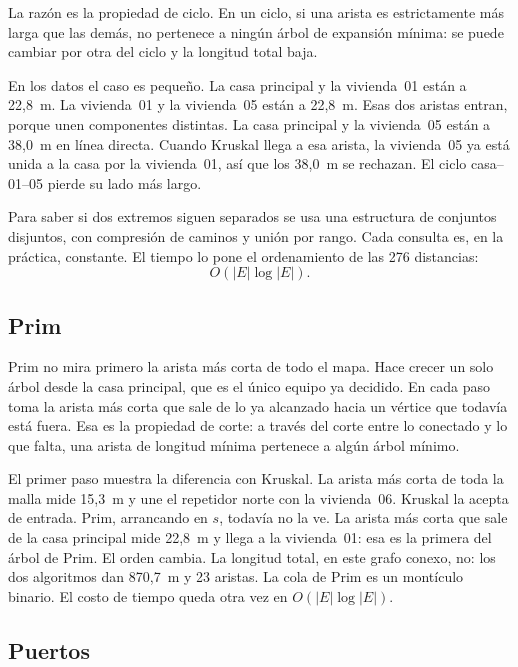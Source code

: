 \documentclass[12pt,a4paper]{article}
\begin{document}
La razón es la propiedad de ciclo. En un ciclo, si una arista es estrictamente más larga que las demás, no pertenece a ningún árbol de expansión mínima: se puede cambiar por otra del ciclo y la longitud total baja.

En los datos el caso es pequeño. La casa principal y la vivienda~01 están a 22,8~m. La vivienda~01 y la vivienda~05 están a 22,8~m. Esas dos aristas entran, porque unen componentes distintas. La casa principal y la vivienda~05 están a 38,0~m en línea directa. Cuando Kruskal llega a esa arista, la vivienda~05 ya está unida a la casa por la vivienda~01, así que los 38,0~m se rechazan. El ciclo casa--01--05 pierde su lado más largo.

Para saber si dos extremos siguen separados se usa una estructura de conjuntos disjuntos, con compresión de caminos y unión por rango. Cada consulta es, en la práctica, constante. El tiempo lo pone el ordenamiento de las 276 distancias:
\begin{equation}
  O(|E|\log |E|).
  \label{eq:tkruskal}
\end{equation}

\subsection{Prim}

Prim no mira primero la arista más corta de todo el mapa. Hace crecer un solo árbol desde la casa principal, que es el único equipo ya decidido. En cada paso toma la arista más corta que sale de lo ya alcanzado hacia un vértice que todavía está fuera. Esa es la propiedad de corte: a través del corte entre lo conectado y lo que falta, una arista de longitud mínima pertenece a algún árbol mínimo.

El primer paso muestra la diferencia con Kruskal. La arista más corta de toda la malla mide 15,3~m y une el repetidor norte con la vivienda~06. Kruskal la acepta de entrada. Prim, arrancando en \(s\), todavía no la ve. La arista más corta que sale de la casa principal mide 22,8~m y llega a la vivienda~01: esa es la primera del árbol de Prim. El orden cambia. La longitud total, en este grafo conexo, no: los dos algoritmos dan 870,7~m y 23 aristas. La cola de Prim es un montículo binario. El costo de tiempo queda otra vez en \(O(|E|\log |E|)\).

\subsection{Puertos}
\end{document}
